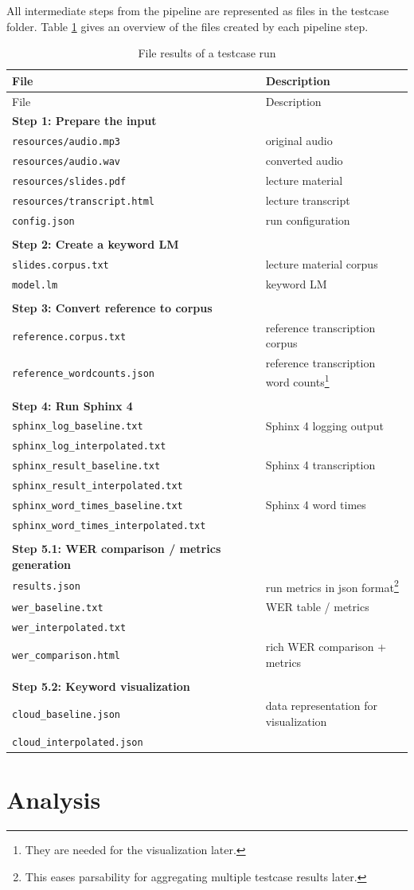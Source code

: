 \documentclass[]{article}
\begin{document}
All intermediate steps from the pipeline are represented as files in the
testcase folder. Table \ref{files} gives an overview of the files
created by each pipeline step.

\begin{longtable}[c]{@{}ll@{}}
\caption{File results of a testcase run\label{files}}\tabularnewline
\toprule
File & Description\tabularnewline
\midrule
\endfirsthead
\toprule
File & Description\tabularnewline
\midrule
\endhead
\textbf{Step 1: Prepare the input} &\tabularnewline
\texttt{resources/audio.mp3} & original audio\tabularnewline
\texttt{resources/audio.wav} & converted audio\tabularnewline
\texttt{resources/slides.pdf} & lecture material\tabularnewline
\texttt{resources/transcript.html} & lecture transcript\tabularnewline
\texttt{config.json} & run configuration\tabularnewline
&\tabularnewline
\textbf{Step 2: Create a keyword LM} &\tabularnewline
\texttt{slides.corpus.txt} & lecture material corpus\tabularnewline
\texttt{model.lm} & keyword LM\tabularnewline
&\tabularnewline
\textbf{Step 3: Convert reference to corpus} &\tabularnewline
\texttt{reference.corpus.txt} & reference transcription
corpus\tabularnewline
\texttt{reference\_wordcounts.json} & reference transcription word
counts\footnote{They are needed for the visualization later.}\tabularnewline
&\tabularnewline
\textbf{Step 4: Run Sphinx 4} &\tabularnewline
\texttt{sphinx\_log\_baseline.txt} & Sphinx 4 logging
output\tabularnewline
\texttt{sphinx\_log\_interpolated.txt} &\tabularnewline
\texttt{sphinx\_result\_baseline.txt} & Sphinx 4
transcription\tabularnewline
\texttt{sphinx\_result\_interpolated.txt} &\tabularnewline
\texttt{sphinx\_word\_times\_baseline.txt} & Sphinx 4 word
times\tabularnewline
\texttt{sphinx\_word\_times\_interpolated.txt} &\tabularnewline
&\tabularnewline
\textbf{Step 5.1: WER comparison / metrics generation} &\tabularnewline
\texttt{results.json} & run metrics in json format\footnote{This eases
  parsability for aggregating multiple testcase results later.}\tabularnewline
\texttt{wer\_baseline.txt} & WER table / metrics\tabularnewline
\texttt{wer\_interpolated.txt} &\tabularnewline
\texttt{wer\_comparison.html} & rich WER comparison +
metrics\tabularnewline
&\tabularnewline
\textbf{Step 5.2: Keyword visualization} &\tabularnewline
\texttt{cloud\_baseline.json} & data representation for
visualization\tabularnewline
\texttt{cloud\_interpolated.json} &\tabularnewline
\bottomrule
\end{longtable}

\section{Analysis}\label{analysiss}
\end{document}
